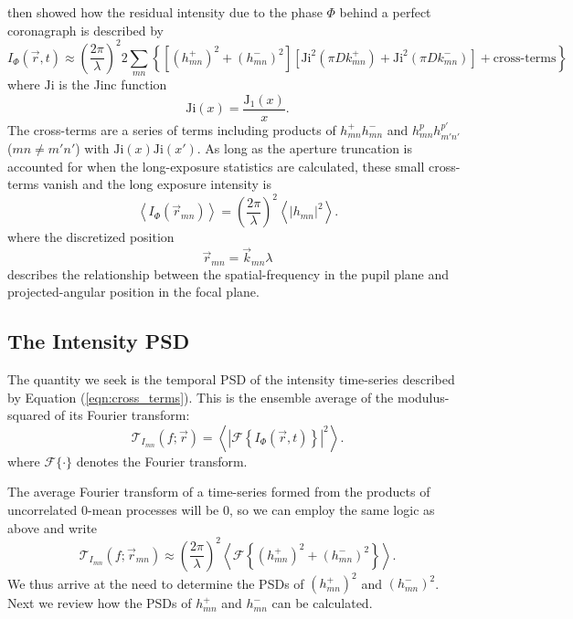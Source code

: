 \documentclass[10pt,preprint]{aastex631}
\newcommand{\Ji}{\mathrm{Ji}}
\begin{document}
\citet{2018JATIS...4a9001M} then showed how the residual intensity due to the phase $\Phi$ behind a perfect coronagraph is described by
\begin{equation}
I_\Phi(\vec{r},t) \approx \left(\frac{2\pi}{\lambda}\right)^2 2 \sum_{mn} \left\{  \left[ (h_{mn}^{+})^2 + (h_{mn}^{-})^2 \right] \left[ \Ji^2(\pi D k_{mn}^+) +\Ji^2(\pi D k_{mn}^-)\right] + \mbox{cross-terms} \right\}
\label{eqn:cross_terms}
\end{equation}
where $\Ji$ is the Jinc function
\begin{equation}
\Ji(x) = \frac{\mathrm{J}_1(x)}{x}.
\end{equation}
The cross-terms are a series of terms including products of $h_{mn}^+h_{mn}^-$ and $h_{mn}^ph_{m'n'}^{p'}$ ($mn \neq m'n'$) with $\Ji(x)\Ji(x')$. As long as the aperture truncation is accounted for when the long-exposure statistics are calculated,  these small cross-terms vanish and the long exposure intensity is 
\begin{equation}
\left< I_\Phi(\vec{r}_{mn}) \right> =  \left(\frac{2\pi}{\lambda}\right)^2\left< |h_{mn}|^2 \right> .
\label{eqn:contrast_h2}
\end{equation}
where the discretized position 
\begin{equation}
\vec{r}_{mn} = \vec{k}_{mn} \lambda
\end{equation}
describes the relationship between the spatial-frequency in the pupil plane and projected-angular position in the focal plane.

\subsection{The Intensity PSD}

The quantity we seek is the temporal PSD of the intensity time-series described by Equation (\ref{eqn:cross_terms}).  This is the ensemble average of the modulus-squared of its Fourier transform:
\begin{equation}
\mathcal{T}_{I_{mn}}(f;\vec{r}) = \left\langle \left| \mathcal{F} \left\{ I_\Phi(\vec{r},t) \right\} \right|^2 \right\rangle.
\end{equation}
where $\mathcal{F}\{\cdot\}$ denotes the Fourier transform.

The average Fourier transform of a time-series formed from the products of uncorrelated 0-mean processes will be 0, so we can employ the same logic as above and write
\begin{equation}
\mathcal{T}_{I_{mn}}(f;\vec{r}_{mn}) \approx \left(\frac{2\pi}{\lambda}\right)^2  \left\langle \mathcal{F}\left\{  (h_{mn}^{+})^2 + (h_{mn}^{-})^2  \right\} \right\rangle  .
\label{eqn:psd_h2}
\end{equation}
We thus arrive at the need to determine the PSDs of $(h_{mn}^{+})^2$ and $(h_{mn}^{-})^2$.  Next we review how the PSDs of $h_{mn}^{+}$ and $h_{mn}^{-}$ can be calculated.
\end{document}
